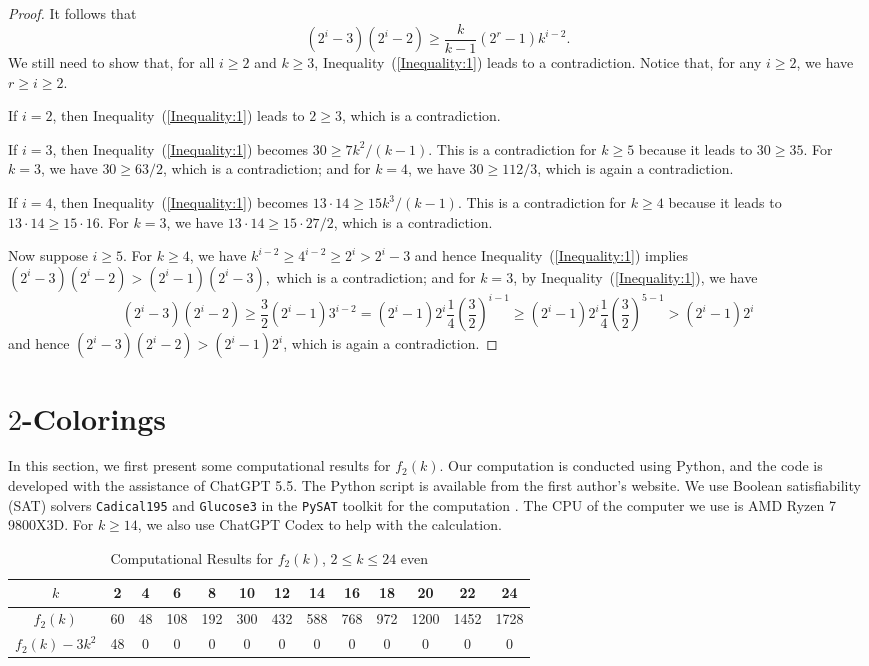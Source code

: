 \documentclass[11pt]{article}
\theoremstyle{definition}
\begin{document}
\begin{proof}
    It follows that
    \begin{equation}\label{Inequality:1}
(2^i-3)(2^i-2)\geq\frac{k}{k-1}(2^r-1)k^{i-2}.  
\end{equation}
We still need to show that, for all $i\geq2$ and $k\geq3$, Inequality~(\ref{Inequality:1}) leads to a contradiction. Notice that, for any $i\geq2$, we have $r\geq i\geq2$. 

If $i=2$, then Inequality~(\ref{Inequality:1}) leads to $2\geq3$, which is a contradiction. 

If $i=3$, then Inequality~(\ref{Inequality:1}) becomes $30\geq7k^2/(k-1)$. This is a contradiction for $k\geq5$ because it leads to $30\geq35$. For $k=3$, we have $30\geq63/2$, which is a contradiction; and for $k=4$, we have $30\geq112/3$, which is again a contradiction.

If $i=4$, then Inequality~(\ref{Inequality:1}) becomes $13\cdot14\geq15k^3/(k-1)$. This is a contradiction for $k\geq4$ because it leads to $13\cdot14\geq15\cdot16$. For $k=3$, we have $13\cdot14\geq15\cdot27/2$, which is a contradiction.

Now suppose $i\geq5$. For $k\geq4$, we have $k^{i-2}\geq4^{i-2}\geq 2^i>2^i-3$ and hence Inequality~(\ref{Inequality:1}) implies
$
(2^i-3)(2^i-2)>(2^i-1)(2^i-3),
$
which is a contradiction; and for $k=3$, by Inequality~(\ref{Inequality:1}), we have
    \[
    (2^i-3)(2^i-2)\geq\frac{3}{2}(2^i-1)3^{i-2}=(2^i-1)2^i\frac{1}{4}\left(\frac{3}{2}\right)^{i-1}\geq(2^i-1)2^i\frac{1}{4}\left(\frac{3}{2}\right)^{5-1}>(2^i-1)2^i
    \]
    and hence $(2^i-3)(2^i-2)>(2^i-1)2^i$, which is again a contradiction.
\end{proof}

\section{$2$-Colorings}\label{Section:Computation2Coloring}
In this section, we first present some computational results for $f_2(k)$. Our computation is conducted using Python, and the code is developed with the assistance of ChatGPT 5.5. The Python script is available from the first author's website. We use Boolean satisfiability (SAT) solvers \texttt{Cadical195} and \texttt{Glucose3} in the \texttt{PySAT} toolkit for the computation \cite{ITK2024}. The CPU of the computer we use is AMD Ryzen 7 9800X3D. For $k\geq14$, we also use ChatGPT Codex to help with the calculation.



\begin{table}[H]
\renewcommand{\arraystretch}{1.5}
\centering
\begin{tabular}{|c|c|c|c|c|c|c|c|c|c|c|c|c|}
\hline
$k$&2&4&6&8&10&12&14&16&18&20&22&24\\\hline
$f_2(k)$&60&48&108&192&300&432&588&768&972&1200&1452&1728\\\hline
$f_2(k)-3k^2$&48&0&0&0&0&0&0&0&0&0&0&0\\\hline
\end{tabular}
\caption{Computational Results for $f_2(k)$, $2\leq k\leq 24$ even}\label{Table1}
\end{table}
\end{document}
